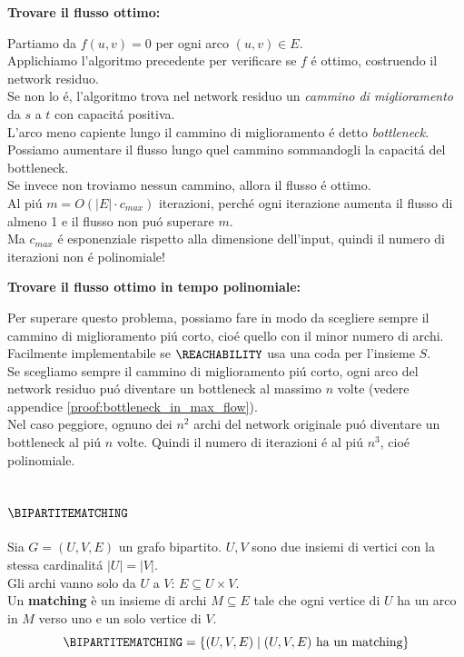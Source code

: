 \textbf{Trovare il flusso ottimo:}

Partiamo da $f(u,v) = 0$ per ogni arco $(u,v) \in E$. \\
Applichiamo l'algoritmo precedente per verificare se $f$ é ottimo, costruendo il network residuo. \\
Se non lo é, l'algoritmo trova nel network residuo
un \textit{cammino di miglioramento} da $s$ a $t$ con capacitá positiva. \\
L'arco meno capiente lungo il cammino di miglioramento é detto \textit{bottleneck}. \\
Possiamo aumentare il flusso lungo quel cammino sommandogli la capacitá del bottleneck. \\
Se invece non troviamo nessun cammino, allora il flusso é ottimo. \\
Al piú $m = O(|E| \cdot c_{max})$ iterazioni, perché ogni iterazione 
aumenta il flusso di almeno 1 e il flusso non puó superare $m$. \\
Ma $c_{max}$ é esponenziale rispetto alla dimensione dell'input, 
quindi il numero di iterazioni non é polinomiale!

\textbf{Trovare il flusso ottimo in tempo polinomiale:}

Per superare questo problema, possiamo fare in modo da scegliere sempre il 
cammino di miglioramento piú corto, cioé quello con il minor numero di archi. \\
Facilmente implementabile se $\REACHABILITY$ usa una coda per l'insieme $S$. \\
Se scegliamo sempre il cammino di miglioramento piú corto, 
ogni arco del network residuo puó diventare un bottleneck al massimo $n$ volte (vedere appendice \ref{proof:bottleneck_in_max_flow}). \\

Nel caso peggiore, ognuno dei $n^2$ archi del network originale 
puó diventare un bottleneck al piú $n$ volte.
Quindi il numero di iterazioni é al piú $n^3$, cioé polinomiale.


\subsection{$\BIPARTITEMATCHING$}
Sia $G = (U, V, E)$ un grafo bipartito. $U, V$ sono due insiemi di vertici con la stessa cardinalitá $|U| = |V|$. \\ 
Gli archi vanno solo da $U$ a $V$: $E \subseteq U \times V$. \\
Un \textbf{matching} è un insieme di archi $M \subseteq E$ tale che ogni vertice di $U$ ha un arco in $M$ verso uno e un solo vertice di $V$.
\[
\BIPARTITEMATCHING = \{ (U, V, E) \mid (U, V, E) \text{ ha un matching} \}
\]

